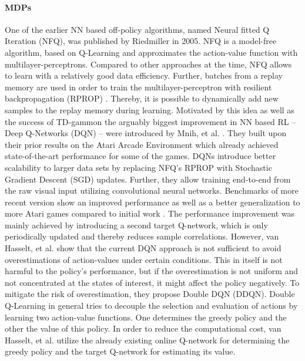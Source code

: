  	\paragraph{MDPs}
		\label{sec:off-policy}
		One of the earlier NN based off-policy algorithms, named Neural fitted Q Iteration (NFQ), was published by Riedmiller \cite{Riedmiller2005} in 2005. 
		NFQ is a model-free algorithm, based on Q-Learning \cite{Watkins1989} and approximates the action-value function with multilayer-perceptrons.
		Compared to other approaches at the time, NFQ allows to learn with a relatively good data efficiency.
		Further, batches from a replay memory \cite{Lin1992} are used in order to train the multilayer-perceptron with resilient backpropagation (RPROP) \cite{Riedmiller1993}.
		Thereby, it is possible to dynamically add new samples to the replay memory during learning.
		Motivated by this idea as well as the success of TD-gammon \cite{Tesauro1994} the arguably biggest improvement in NN based RL -- Deep Q-Networks (DQN) -- were introduced by Mnih, et al. \cite{Mnih2015}.   
		They built upon their prior results \cite{Mnih2013} on the Atari Arcade Environment \cite{Bellemare2013} which already achieved state-of-the-art performance for some of the games.
		DQNs introduce better scalability to larger data sets by replacing NFQ's RPROP with Stochastic Gradient Descent (SGD) updates. 
		Further, they allow training end-to-end from the raw visual input utilizing convolutional neural networks. 
		Benchmarks of more recent version \cite{Mnih2015} show an improved performance as well as a better generalization to more Atari games compared to initial work \cite{Mnih2013}.
		The performance improvement was mainly achieved by introducing a second target Q-network, which is only periodically updated and thereby reduces sample correlations. 
		However, van Hasselt, et al. \cite{VanHasselt2016} show that the current DQN \cite{Mnih2015} approach is not sufficient to avoid overestimations of action-values under certain conditions. 
		This in itself is not harmful to the policy's performance, but if the overestimation is not uniform and not concentrated at the states of interest, it might affect the policy negatively. 
		To mitigate the risk of overestimation, they propose Double DQN (DDQN).
		Double Q-Learning in general tries to decouple the selection and evaluation of actions by learning two action-value functions. 
		One determines the greedy policy and the other the value of this policy.  
		In order to reduce the computational cost, van Hasselt, et al. utilize the already existing online Q-network for determining the greedy policy and the target Q-network for estimating its value. 
